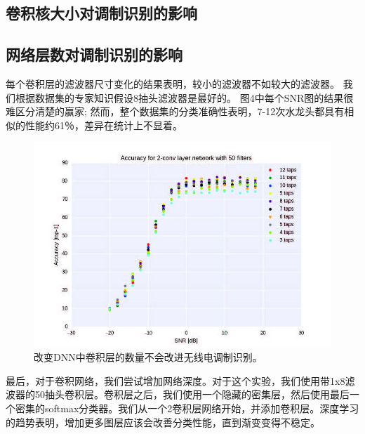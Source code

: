\subsection{卷积核大小对调制识别的影响}

\subsection{网络层数对调制识别的影响}

每个卷积层的滤波器尺寸变化的结果表明，较小的滤波器不如较大的滤波器。 我们根据数据集的专家知识假设8抽头滤波器是最好的。 图4中每个SNR图的结果很难区分清楚的赢家; 然而，整个数据集的分类准确性表明，7-12次水龙头都具有相似的性能约61％，差异在统计上不显着。\par

\begin{figure}[!h]
	\centering
	\includegraphics[scale=1]{figures/chapter_5/fig2}
	\caption{改变DNN中卷积层的数量不会改进无线电调制识别。}\label{fig_5_2}
\end{figure}

最后，对于卷积网络，我们尝试增加网络深度。对于这个实验，我们使用带1x8滤波器的50抽头卷积层。卷积层之后，我们使用一个隐藏的密集层，然后使用最后一个密集的softmax分类器。我们从一个2卷积层网络开始，并添加卷积层。深度学习的趋势表明，增加更多图层应该会改善分类性能，直到渐变变得不稳定。\par


